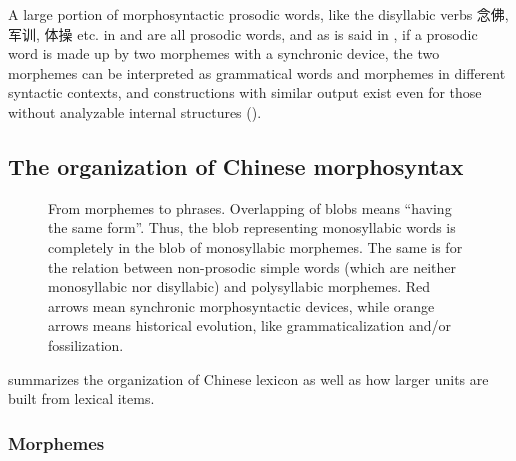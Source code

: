 \documentclass[UTF8, a4paper, oneside, scheme=plain]{ctexart}
\begin{document}
A large portion of morphosyntactic prosodic words,
like the disyllabic verbs 念佛, 军训, 体操 etc. 
in  and 
are all prosodic words,
and as is said in ,
if a prosodic word is made up by two morphemes with a synchronic device,
the two morphemes can be interpreted as grammatical words and morphemes in different syntactic contexts,
and constructions with similar output 
exist even for those without analyzable internal structures ().

\subsection{The organization of Chinese morphosyntax}

\begin{figure}
    \centering
    
    \caption{From morphemes to phrases. 
    Overlapping of blobs means ``having the same form''.
    Thus, the blob representing monosyllabic words is completely in the blob of monosyllabic morphemes.
    The same is for the relation between non-prosodic simple words 
    (which are neither monosyllabic nor disyllabic) and polysyllabic morphemes.
    Red arrows mean synchronic morphosyntactic devices,
    while orange arrows means historical evolution,
    like grammaticalization and/or fossilization.}
    \label{fig:morpheme-to-phrase}
\end{figure}

 summarizes the organization of Chinese lexicon 
as well as how larger units are built from lexical items.

\subsubsection{Morphemes}
\end{document}
